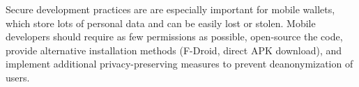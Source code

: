 
Secure development practices are are especially important for mobile wallets, which store lots of personal data and can be easily lost or stolen.
Mobile developers should require as few permissions as possible, open-source the code, provide alternative installation methods (F-Droid, direct APK download), and implement additional privacy-preserving measures to prevent deanonymization of users.